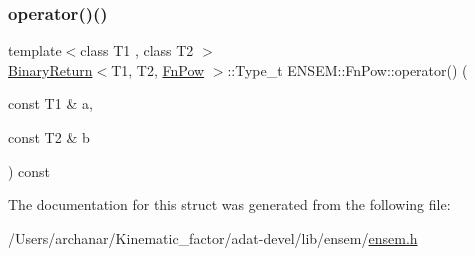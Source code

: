 \subsubsection{\texorpdfstring{operator()()}{operator()()}\hspace{0.1cm}{\footnotesize\ttfamily [3/3]}}
{\footnotesize\ttfamily template$<$class T1 , class T2 $>$ \\
\mbox{\hyperlink{structENSEM_1_1BinaryReturn}{Binary\+Return}}$<$T1, T2, \mbox{\hyperlink{structENSEM_1_1FnPow}{Fn\+Pow}} $>$\+::Type\+\_\+t E\+N\+S\+E\+M\+::\+Fn\+Pow\+::operator() (\begin{DoxyParamCaption}\item[{const T1 \&}]{a,  }\item[{const T2 \&}]{b }\end{DoxyParamCaption}) const\hspace{0.3cm}{\ttfamily [inline]}}



The documentation for this struct was generated from the following file\+:\begin{DoxyCompactItemize}
\item 
/\+Users/archanar/\+Kinematic\+\_\+factor/adat-\/devel/lib/ensem/\mbox{\hyperlink{adat-devel_2lib_2ensem_2ensem_8h}{ensem.\+h}}\end{DoxyCompactItemize}

